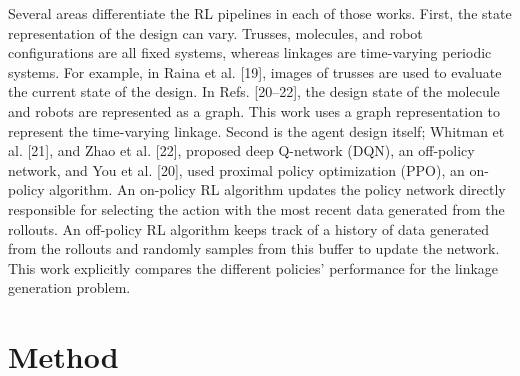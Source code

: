Several areas differentiate the RL pipelines in each of those works. First, the state representation of the design can vary. Trusses, molecules, and robot configurations are all fixed systems, whereas linkages are time-varying periodic systems. For example, in Raina et al. [19], images of trusses are used to evaluate the current state of the design. In Refs. [20–22], the design state of the molecule and robots are represented as a graph. This work uses a graph representation to represent the time-varying linkage. Second is the agent design itself; Whitman et al. [21], and Zhao et al. [22], proposed deep Q-network (DQN), an off-policy network, and You et al. [20], used proximal policy optimization (PPO), an on-policy algorithm. An on-policy RL algorithm updates the policy network directly responsible for selecting the action with the most recent data generated from the rollouts. An off-policy RL algorithm keeps track of a history of data generated from the rollouts and randomly samples from this buffer to update the network. This work explicitly compares the different policies’ performance for the linkage generation problem.

\section{Method}


